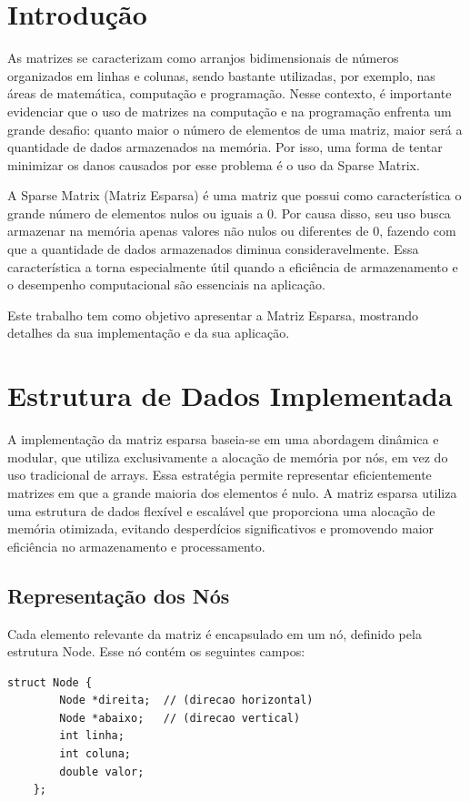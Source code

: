 \documentclass[12pt]{article}
\begin{document}
\section{Introdução} 

As matrizes se caracterizam como arranjos bidimensionais de números organizados em linhas e colunas, sendo bastante utilizadas, por exemplo, nas áreas de matemática, computação e programação. Nesse contexto, é importante evidenciar que o uso de matrizes na computação e na programação enfrenta um grande desafio: quanto maior o número de elementos de uma matriz, maior será a quantidade de dados armazenados na memória. Por isso, uma forma de tentar minimizar os danos causados por esse problema é o uso da Sparse Matrix.

A Sparse Matrix (Matriz Esparsa) é uma matriz que possui como característica o grande número de elementos nulos ou iguais a 0. Por causa disso, seu uso busca armazenar na memória apenas valores não nulos ou diferentes de 0, fazendo com que a quantidade de dados armazenados diminua consideravelmente. Essa característica a torna especialmente útil quando a eficiência de armazenamento e o desempenho computacional são essenciais na aplicação. 

Este trabalho tem como objetivo apresentar a Matriz Esparsa, mostrando detalhes da sua implementação e da sua aplicação.

\section{Estrutura de Dados Implementada} \label{sec:EstruturadeDadosImplementada}
A implementação da matriz esparsa baseia-se em uma abordagem dinâmica e modular, que utiliza exclusivamente a alocação de memória por nós, em vez do uso tradicional de arrays. Essa estratégia permite representar eficientemente matrizes em que a grande maioria dos elementos é nulo. A matriz esparsa utiliza uma estrutura de dados flexível e escalável que proporciona uma alocação de memória otimizada, evitando desperdícios significativos e promovendo maior eficiência no armazenamento e processamento.

    \subsection{Representação dos Nós}
    Cada elemento relevante da matriz é encapsulado em um nó, definido pela estrutura Node. Esse nó contém os seguintes campos:
    
\begin{lstlisting}[caption={Estrutura do Nó em C++}]
    struct Node {
        Node *direita;  // (direcao horizontal)
        Node *abaixo;   // (direcao vertical)
        int linha;
        int coluna;
        double valor;
    };
\end{lstlisting}
\end{document}
